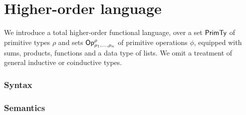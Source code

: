 \section{Higher-order language}
\label{sec:language}

We introduce a total higher-order functional language, over a set $\mathsf{PrimTy}$ of primitive types $\rho$ and sets
$\mathsf{Op}^\rho_{\rho_1,\ldots,\rho_n}$ of primitive operations $\phi$, equipped with sums, products, functions
and a data type of lists. We omit a treatment of general inductive or coinductive types.

\subsubsection{Syntax}
\label{sec:language:syntax}


% 


\subsubsection{Semantics}
\label{sec:language:semantics}

% 
% 
%
%
